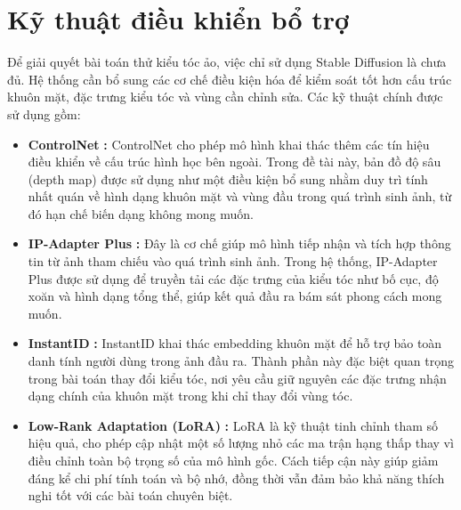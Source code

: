 \documentclass[../main.tex]{subfiles}
\begin{document}
\section{Kỹ thuật điều khiển bổ trợ}
Để giải quyết bài toán thử kiểu tóc ảo, việc chỉ sử dụng Stable Diffusion là chưa đủ. Hệ thống cần bổ sung các cơ chế điều kiện hóa để kiểm soát tốt hơn cấu trúc khuôn mặt, đặc trưng kiểu tóc và vùng cần chỉnh sửa. Các kỹ thuật chính được sử dụng gồm:
\begin{itemize}
    \item \textbf{ControlNet} \cite{zhang2023controlnet}\textbf{:}
    ControlNet cho phép mô hình khai thác thêm các tín hiệu điều khiển về cấu trúc hình học bên ngoài. Trong đề tài này, bản đồ độ sâu (depth map) được sử dụng như một điều kiện bổ sung nhằm duy trì tính nhất quán về hình dạng khuôn mặt và vùng đầu trong quá trình sinh ảnh, từ đó hạn chế biến dạng không mong muốn.

    \item \textbf{IP-Adapter Plus} \cite{ye2023ipadapter}\textbf{:}
    Đây là cơ chế giúp mô hình tiếp nhận và tích hợp thông tin từ ảnh tham chiếu vào quá trình sinh ảnh. Trong hệ thống, IP-Adapter Plus được sử dụng để truyền tải các đặc trưng của kiểu tóc như bố cục, độ xoăn và hình dạng tổng thể, giúp kết quả đầu ra bám sát phong cách mong muốn.

    \item \textbf{InstantID} \cite{wang2024instantid}\textbf{:}
    InstantID khai thác embedding khuôn mặt để hỗ trợ bảo toàn danh tính người dùng trong ảnh đầu ra. Thành phần này đặc biệt quan trọng trong bài toán thay đổi kiểu tóc, nơi yêu cầu giữ nguyên các đặc trưng nhận dạng chính của khuôn mặt trong khi chỉ thay đổi vùng tóc.

    \item \textbf{Low-Rank Adaptation (LoRA)} \cite{hu2022lora}\textbf{:}
    LoRA là kỹ thuật tinh chỉnh tham số hiệu quả, cho phép cập nhật một số lượng nhỏ các ma trận hạng thấp thay vì điều chỉnh toàn bộ trọng số của mô hình gốc. Cách tiếp cận này giúp giảm đáng kể chi phí tính toán và bộ nhớ, đồng thời vẫn đảm bảo khả năng thích nghi tốt với các bài toán chuyên biệt.
\end{itemize}
\end{document}
